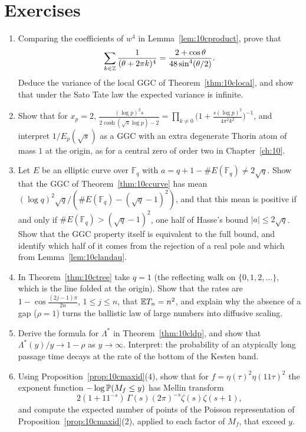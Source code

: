 \section{Exercises}

\begin{enumerate}
\item Comparing the coefficients of $w^4$ in Lemma~\ref{lem:10cproduct}, prove that
\[
\sum_{k\in\mathbb{Z}}\frac{1}{(\theta+2\pi k)^{4}}=\frac{2+\cos\theta}{48\sin^4(\theta/2)}.
\]
Deduce the variance of the local GGC of Theorem~\ref{thm:10clocal}, and show that under the Sato Tate law the expected variance is infinite.

\item\label{ex:10cdegenerate} Show that for $x_p=2$, $\frac{(\log p)^2s}{2\cosh(\sqrt s\log p)-2}=\prod_{k\ne0}\bigl(1+\frac{s(\log p)^2}{4\pi^2k^2}\bigr)^{-1}$, and interpret $1/E_p(\sqrt s)$ as a GGC with an extra degenerate Thorin atom of mass $1$ at the origin, as for a central zero of order two in Chapter~\ref{ch:10}.

\item Let $E$ be an elliptic curve over $\mathbb F_q$ with $a=q+1-\#E(\mathbb F_q)\ne2\sqrt q$. Show that the GGC of Theorem~\ref{thm:10ccurve} has mean $(\log q)^2\sqrt q/(\#E(\mathbb F_q)-(\sqrt q-1)^2)$, and that this mean is positive if and only if $\#E(\mathbb F_q)>(\sqrt q-1)^2$, one half of Hasse's bound $|a|\le2\sqrt q$. Show that the GGC property itself is equivalent to the full bound, and identify which half of it comes from the rejection of a real pole and which from Lemma~\ref{lem:10clandau}.

\item In Theorem~\ref{thm:10ctree} take $q=1$ (the reflecting walk on $\{0,1,2,\dots\}$, which is the line folded at the origin). Show that the rates are $1-\cos\frac{(2j-1)\pi}{2n}$, $1\le j\le n$, that $\mathbb{E} T_n=n^2$, and explain why the absence of a gap ($\rho=1$) turns the ballistic law of large numbers into diffusive scaling.

\item Derive the formula for $\Lambda^*$ in Theorem~\ref{thm:10cldp}, and show that $\Lambda^*(y)/y\to1-\rho$ as $y\to\infty$. Interpret: the probability of an atypically long passage time decays at the rate of the bottom of the Kesten band.

\item Using Proposition~\ref{prop:10cmaxid}(4), show that for $f=\eta(\tau)^2\eta(11\tau)^2$ the exponent function $-\log\mathbb{P}(M_f\le y)$ has Mellin transform
\[
2(1+11^{-s})\,\Gamma(s)(2\pi)^{-s}\zeta(s)\zeta(s+1),
\]
and compute the expected number of points of the Poisson representation of Proposition~\ref{prop:10cmaxid}(2), applied to each factor of $M_f$, that exceed $y$.
\end{enumerate}

